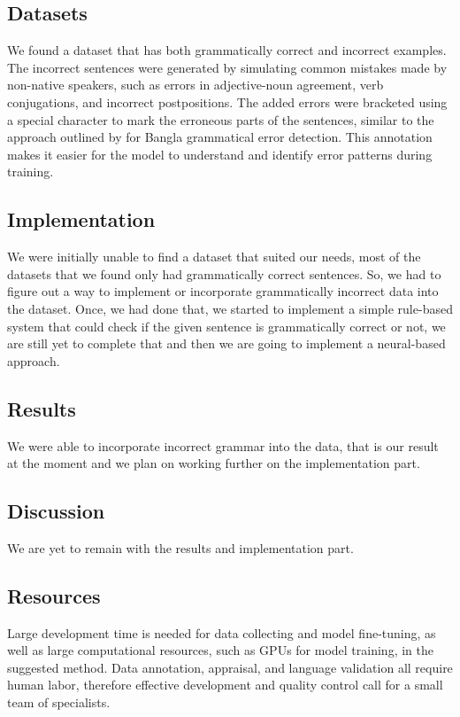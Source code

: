 \documentclass[11pt,a4paper]{article}
\begin{document}
\subsection{Datasets}

We found a dataset that has both grammatically correct and incorrect examples. The incorrect sentences were generated by simulating common mistakes made by non-native speakers, such as errors in adjective-noun agreement, verb conjugations, and incorrect postpositions. 
The added errors were bracketed using a special character to mark the erroneous parts of the sentences, similar to the approach outlined by \cite{shahgir2023} for Bangla grammatical error detection. This annotation makes it easier for the model to understand and identify error patterns during training.


\subsection{Implementation} 
We were initially unable to find a dataset that suited our needs, most of the datasets that we found only had grammatically correct sentences. So, we had to figure out a way to implement or incorporate grammatically incorrect data into the dataset. 
Once, we had done that, we started to implement a simple rule-based system
 that could check if the given sentence is grammatically correct or not, we are still yet to complete that and then we are going to implement a neural-based approach.

\subsection{Results}
We were able to incorporate incorrect grammar into the data, that is our result at the moment and 
we plan on working further on the implementation part.

\subsection{Discussion}
We are yet to remain with the results and implementation part.

\subsection{Resources}
Large development time is needed for data collecting and model fine-tuning, as well as large computational resources, such as GPUs for model training, in the suggested method. Data annotation, appraisal, and language validation all require human labor, therefore effective development and quality control call for a small team of specialists.
\end{document}
